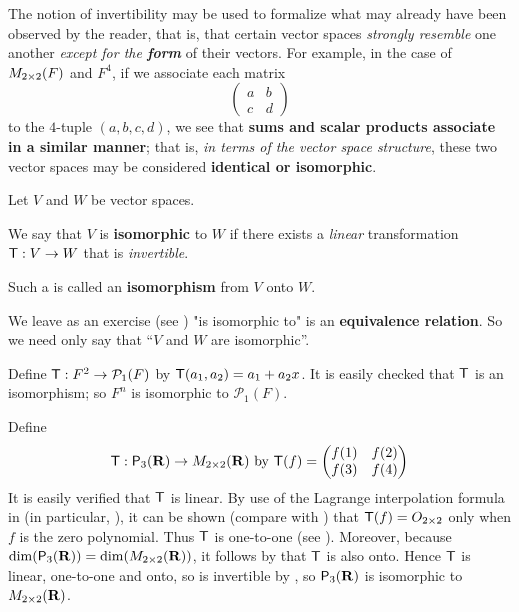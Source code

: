 \begin{remark} \label{remark 2.4.2}
The notion of invertibility may be used to formalize what may already have been observed by the reader, that is,
that certain vector spaces \emph{strongly resemble} one another \emph{except for the \textbf{form}} of their vectors.
For example, in the case of \(M_{2 \times 2}(F)\) and \(F^4\), if we associate each matrix
\[
    \begin{pmatrix} a & b \\ c & d \end{pmatrix}
\]
to the \(4\)-tuple \((a, b, c, d)\), we see that \textbf{sums and scalar products associate in a similar manner};
that is, \emph{in terms of the vector space structure}, these two
vector spaces may be considered \textbf{identical or isomorphic}.
\end{remark}

\begin{definition} \label{def 2.14}
Let \(V\) and \(W\) be vector spaces.

 We say that \(V\) is \textbf{isomorphic} to \(W\) if there exists a \emph{linear} transformation \(\textsf{T} : V \to W\) that is \emph{invertible}.

 Such a \LTRAN{} is called an \textbf{isomorphism} from \(V\) onto \(W\).
\end{definition}

\begin{remark} \label{remark 2.4.3}
We leave as an exercise (see ) "is isomorphic to" is an \textbf{equivalence relation}.
So we need only say that ``\(V\) and \(W\) are isomorphic''.
\end{remark}

\begin{example} \label{example 2.4.4}
Define \(\textsf{T} : F^2 \to \mathcal{P}_1(F)\) by \(\textsf{T}(a_1, a_2) = a_1 + a_2x\).
It is easily checked that \(\textsf{T}\) is an isomorphism;
so \(F^n\) is isomorphic to \(\mathcal{P}_1(F)\).
\end{example}

\begin{example} \label{example 2.4.5}
Define
\[
    \textsf{T} : \textsf{P}_3(\mathbf{R}) \to M_{2 \times 2}(\mathbf{R}) \text{ by }
    \textsf{T}(f) = \begin{pmatrix} f(1) & f(2) \\ f(3) & f(4) \end{pmatrix}
\]
It is easily verified that \(\textsf{T}\) is linear.
By use of the Lagrange interpolation formula in (in particular, ), it can be shown (compare with ) that \(\textsf{T}(f) = O_{2 \times 2}\) only when \(f\) is the zero polynomial.
Thus \(\textsf{T}\) is one-to-one (see ).
Moreover, because \(\dim(\textsf{P}_3(\mathbf{R})) = \dim(M_{2 \times 2}(\mathbf{R}))\), it follows by  that \(\textsf{T}\) is also onto.
Hence \(\textsf{T}\) is linear, one-to-one and onto, so is invertible by , so \(\textsf{P}_3(\mathbf{R})\) is isomorphic to \(M_{2 \times 2}(\mathbf{R})\).
\end{example}

